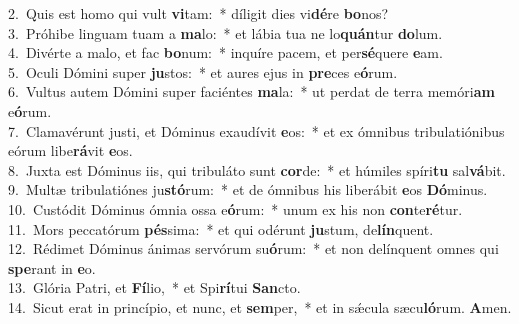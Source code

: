 {2.~}Quis est homo qui vult \textbf{vi}tam:~* díligit dies vi\textbf{dé}re \textbf{bo}nos?\\
{3.~}Próhibe linguam tuam a \textbf{ma}lo:~* et lábia tua ne lo\textbf{quán}tur \textbf{do}lum.\\
{4.~}Divérte a malo, et fac \textbf{bo}num:~* inquíre pacem, et per\textbf{sé}quere \textbf{e}am.\\
{5.~}Oculi Dómini super \textbf{ju}stos:~* et aures ejus in \textbf{pre}ces e\textbf{ó}rum.\\
{6.~}Vultus autem Dómini super faciéntes \textbf{ma}la:~* ut perdat de terra memóri\textbf{am} e\textbf{ó}rum.\\
{7.~}Clamavérunt justi, et Dóminus exaudívit \textbf{e}os:~* et ex ómnibus tribulatiónibus eórum libe\textbf{rá}vit \textbf{e}os.\\
{8.~}Juxta est Dóminus iis, qui tribuláto sunt \textbf{cor}de:~* et húmiles spíri\textbf{tu} sal\textbf{vá}bit.\\
{9.~}Multæ tribulatiónes ju\textbf{stó}rum:~* et de ómnibus his liberábit \textbf{e}os \textbf{Dó}minus.\\
{10.~}Custódit Dóminus ómnia ossa e\textbf{ó}rum:~* unum ex his non \textbf{con}te\textbf{ré}tur.\\
{11.~}Mors peccatórum \textbf{pés}sima:~* et qui odérunt \textbf{ju}stum, de\textbf{lín}quent.\\
{12.~}Rédimet Dóminus ánimas servórum su\textbf{ó}rum:~* et non delínquent omnes qui \textbf{spe}rant in \textbf{e}o.\\
{13.~}Glória Patri, et \textbf{Fí}lio,~* et Spi\textbf{rí}tui \textbf{San}cto.\\
{14.~}Sicut erat in princípio, et nunc, et \textbf{sem}per,~* et in sǽcula sæcu\textbf{ló}rum. \textbf{A}men.\\
